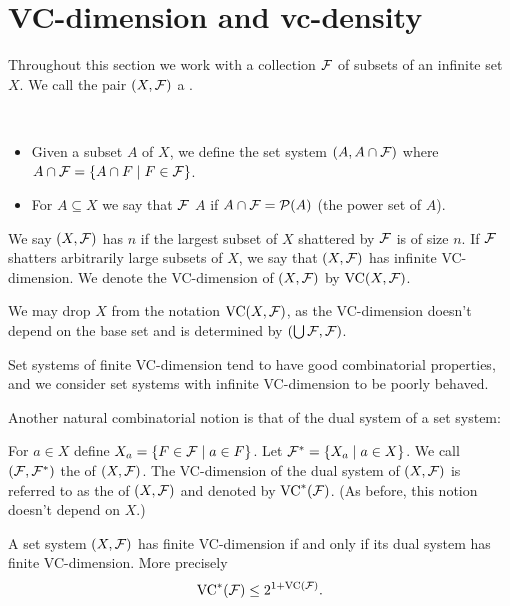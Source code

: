 

\section{VC-dimension and vc-density}
Throughout this section we work with a collection $\mathcal F$ of subsets of an infinite set $X$.
We call the pair $(X, \mathcal F)$ a .

\begin{Definition} \ 
  \begin{itemize} 
  \item Given a subset $A$ of $X$, we define the set system $(A, A \cap \mathcal F)$
    where $A \cap \mathcal F = \left\{A \cap F \mid F\in \mathcal F\right\}$.
  \item For $A \subseteq X$ we say that $\mathcal F$  $A$ if $A \cap \mathcal F = \mathcal P(A)$ (the power set of $A$).
  \end{itemize}    
\end{Definition}  

\begin{Definition}
  We say $(X, \mathcal F)$ has  $n$ if the largest subset of $X$ shattered by $\mathcal F$ is of size $n$.
  If $\mathcal F$ shatters arbitrarily large subsets of $X$, we say that $(X, \mathcal F)$ has infinite VC-dimension.
  We denote the VC-dimension of $(X, \mathcal F)$ by $\operatorname{VC}(X, \mathcal F)$.
\end{Definition}  

\begin{Note}
  We may drop $X$ from the notation $\operatorname{VC}(X, \mathcal F)$, as the VC-dimension doesn't depend on the base set and is determined by $(\bigcup \mathcal F, \mathcal F)$.
\end{Note}
Set systems of finite VC-dimension tend to have good combinatorial properties,
and we consider set systems with infinite VC-dimension to be poorly behaved.

Another natural combinatorial notion is that of the dual system of a set system:
\begin{Definition}
  For $a \in X$ define $X_a = \left\{F \in \mathcal F \mid a \in F\right\}$.
  Let $\mathcal F^* = \left\{X_a \mid a \in X\right\}$.
  We call $(\mathcal F, \mathcal F^*)$ the  of $(X, \mathcal F)$.
  The VC-dimension of the dual system of $(X, \mathcal F)$ is referred to as the  of $(X, \mathcal F)$ and denoted by $\operatorname{VC}^*(\mathcal F)$.
  (As before, this notion doesn't depend on $X$.)
\end{Definition}  

\begin{Lemma} 
  A set system $(X, \mathcal F)$ has finite VC-dimension if and only if its dual system has finite VC-dimension.
  More precisely
  \begin{align*}
    \operatorname{VC}^*(\mathcal F) \leq 2^{1+\operatorname{VC}(\mathcal F)}.
  \end{align*}
\end{Lemma}

